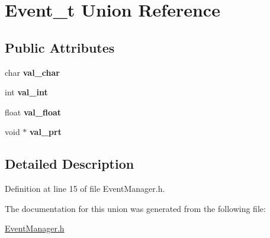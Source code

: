 \hypertarget{unionEvent__t}{
\section{Event\_\-t Union Reference}
\label{unionEvent__t}
}
\subsection*{Public Attributes}
\begin{DoxyCompactItemize}
\item 
\hypertarget{unionEvent__t_adb49e47440a212f10c610758705fb904}{
char {\bfseries val\_\-char}}
\label{unionEvent__t_adb49e47440a212f10c610758705fb904}

\item 
\hypertarget{unionEvent__t_a3615fd164b5ad6715abe403df2bbf93f}{
int {\bfseries val\_\-int}}
\label{unionEvent__t_a3615fd164b5ad6715abe403df2bbf93f}

\item 
\hypertarget{unionEvent__t_a0bf883f9cb5c41aee07df6436417393e}{
float {\bfseries val\_\-float}}
\label{unionEvent__t_a0bf883f9cb5c41aee07df6436417393e}

\item 
\hypertarget{unionEvent__t_acb8ca4dce006668334992fd8bb40f181}{
void $\ast$ {\bfseries val\_\-prt}}
\label{unionEvent__t_acb8ca4dce006668334992fd8bb40f181}

\end{DoxyCompactItemize}


\subsection{Detailed Description}


Definition at line 15 of file EventManager.h.



The documentation for this union was generated from the following file:\begin{DoxyCompactItemize}
\item 
\hyperlink{EventManager_8h}{EventManager.h}\end{DoxyCompactItemize}
